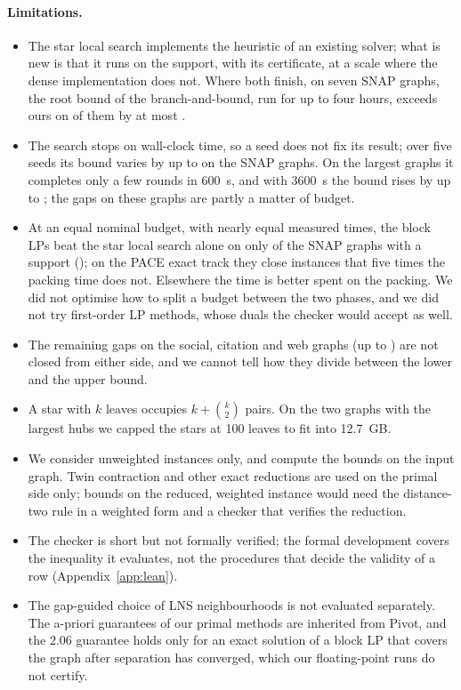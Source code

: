 \paragraph{Limitations.}
\begin{itemize}
\item The star local search implements the heuristic of an existing solver;
what is new is that it runs on the support, with its certificate, at a scale
where the dense implementation does not.  Where both finish, on seven SNAP
graphs, the root bound of the branch-and-bound, run for up to four hours,
exceeds ours on \numRootBetter{} of them by at most \numRootBetterHi{}.
\item The search stops on wall-clock time, so a seed does not fix its
result; over five seeds its bound varies by up to \numSlsSeedSpreadMax{} on
the SNAP graphs.  On the largest graphs it completes only a few rounds in
\SI{600}{s}, and with \SI{3600}{s} the bound rises by up to
\numSlsLongGainMax{}; the gaps on these graphs are partly a matter of budget.
\item At an equal nominal budget, with nearly equal measured times, the block LPs beat the star local search alone on
only \numEqLpWins{} of the \numEqLpN{} SNAP graphs with a support
(\numEqLpWinList{}); on the PACE exact track they close
\numPaceCfOnlyKept{} instances that five times the packing time does not.
Elsewhere the time is better spent on the packing.  We did not
optimise how to split a budget between the two phases, and we did not try
first-order LP methods, whose duals the checker would accept as well.
\item The remaining gaps on the social, citation and web graphs (up to
\numSnapGapHi{}) are not closed from either side, and we cannot tell how they
divide between the lower and the upper bound.
\item A star with $k$ leaves occupies $k+\binom k2$ pairs.  On the two graphs
with the largest hubs we capped the stars at 100 leaves to fit into
\SI{12.7}{GB}.
\item We consider unweighted instances only, and compute the bounds on the
input graph.  Twin contraction and other exact reductions are used on the
primal side only; bounds on the reduced, weighted instance would need the
distance-two rule in a weighted form and a checker that verifies the
reduction.
\item The checker is short but not formally verified; the formal development
covers the inequality it evaluates, not the procedures that decide the
validity of a row (Appendix~\ref{app:lean}).
\item The gap-guided choice of LNS neighbourhoods is not evaluated
separately.  The a-priori guarantees of our primal methods are inherited
from Pivot, and the $2.06$ guarantee holds only for an exact solution of a block LP
that covers the graph after separation has converged, which our
floating-point runs do not certify.
\end{itemize}

